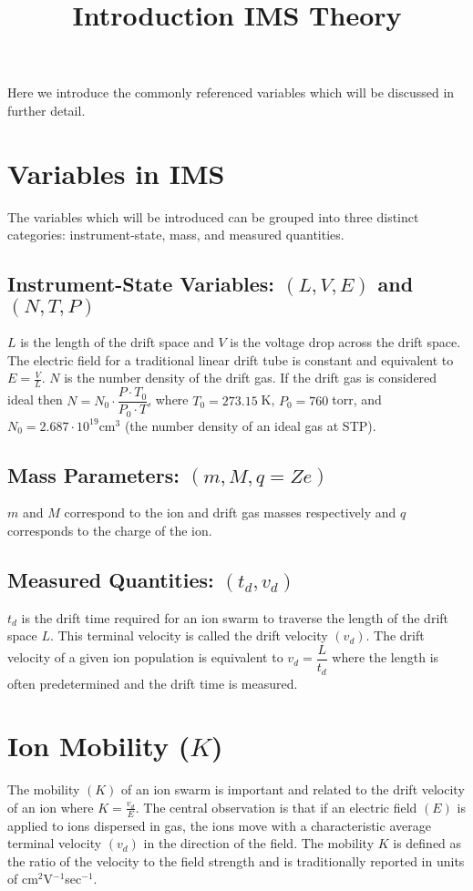 \documentclass[10pt,a4paper]{article}
\title{Introduction IMS Theory}
\begin{document}
Here we introduce the commonly referenced variables which will be discussed in further detail.
\section{Variables in IMS}
The variables which will be introduced can be grouped into three distinct categories: instrument-state, mass, and measured quantities.
\subsection{Instrument-State Variables: $(L, V, E)$ and $(N, T, P)$}
$L$ is the length of the drift space and $V$ is the voltage drop across the drift space. The electric field for a traditional linear drift tube is constant and equivalent to $E=\frac{V}{L}$. $N$ is the number density of the drift gas. If the drift gas is considered ideal then $N=N_0\cdot \dfrac{P\cdot T_0}{P_0\cdot T}$, where $T_0=273.15\;$K, $P_0= 760\;$torr, and  $N_0=2.687\cdot10^{19} \text{cm}^3$ (the number density of an ideal gas at STP).
\subsection{Mass Parameters: $(m, M, q=Ze)$}
$m$ and $M$ correspond to the ion and drift gas masses respectively and $q$ corresponds to the charge of the ion.
\subsection{Measured Quantities: $(t_d, v_d)$}
$t_d$ is the drift time required for an ion swarm to traverse the length of the drift space $L$. This terminal velocity is called the drift velocity $(v_d)$. The drift velocity of a given ion population is equivalent to $v_d=\dfrac{L}{t_d}$ where the length is often predetermined and the drift time is measured.
\section{Ion Mobility ($K$)}
The mobility $(K)$ of an ion swarm is important and related to the drift velocity of an ion where $K=\frac{v_d}{E}$.
The central observation is that if an electric field $(E)$ is applied to ions dispersed in gas, the ions move with a characteristic average terminal velocity $(v_d)$ in the direction of the field. The mobility $K$ is defined as the ratio of the velocity to the field strength and is traditionally reported in units of cm$^2$V$^{-1}$sec$^{-1}$.
\end{document}
